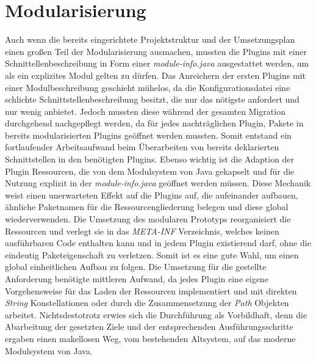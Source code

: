 \section{Modularisierung}
Auch wenn die bereits eingerichtete Projektstruktur und der Umsetzungsplan einen großen Teil der Modularisierung ausmachen, mussten die Plugins mit einer Schnittellenbeschreibung in Form einer \textit{module-info.java} ausgestattet werden, um als ein explizites Modul gelten zu dürfen. Das Anreichern der ersten Plugins mit einer Modulbeschreibung geschieht mühelos, da die Konfigurationsdatei eine schlichte Schnittstellenbeschreibung besitzt, die nur das nötigste anfordert und nur wenig anbietet. Jedoch mussten diese während der gesamten Migration durchgehend nachgepflegt werden, da für jedes nachträglichen Plugin, Pakete in bereits modularisierten Plugins geöffnet werden mussten. Somit entstand ein fortlaufender Arbeitsaufwand beim Überarbeiten von bereits deklarierten Schnittstellen in den benötigten Plugins.\newline
Ebenso wichtig ist die Adaption der Plugin Ressourcen, die von dem Modulsystem von Java gekapselt und für die Nutzung explizit in der \textit{module-info.java} geöffnet werden müssen. Diese Mechanik weist einen unerwarteten Effekt auf die Plugins auf, die aufeinander aufbauen, ähnliche Paketnamen für die Ressourcengliederung belegen und diese global wiederverwenden.\newline
Die Umsetzung des modularen Prototyps reorganisiert die Ressourcen und verlegt sie in das \textit{META-INF} Verzeichnis, welches keinen ausführbaren Code enthalten kann und in jedem Plugin existierend darf, ohne die eindeutig Paketeigenschaft zu verletzen. Somit ist es eine gute Wahl, um einen global einheitlichen Aufbau zu folgen. Die Umsetzung für die gestellte Anforderung benötigte mittleren Aufwand, da jedes Plugin eine eigene Vorgehensweise für das Laden der Ressourcen implementiert und mit direkten \textit{String} Konstellationen oder durch die Zusammensetzung der \textit{Path} Objekten arbeitet. \newline
Nichtsdestotrotz erwies sich die Durchführung als Vorbildhaft, denn die Abarbeitung der gesetzten Ziele und der entsprechenden Ausführungsschritte ergaben einen makellosen Weg, vom bestehenden Altsystem, auf das moderne Modulsystem von Java.\bigbreak

